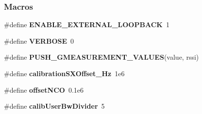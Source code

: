 \subsubsection*{Macros}
\begin{DoxyCompactItemize}
\item 
\#define {\bf E\+N\+A\+B\+L\+E\+\_\+\+E\+X\+T\+E\+R\+N\+A\+L\+\_\+\+L\+O\+O\+P\+B\+A\+CK}~1
\item 
\#define {\bf V\+E\+R\+B\+O\+SE}~0
\item 
\#define {\bf P\+U\+S\+H\+\_\+\+G\+M\+E\+A\+S\+U\+R\+E\+M\+E\+N\+T\+\_\+\+V\+A\+L\+U\+ES}(value,  rssi)
\item 
\#define {\bf calibration\+S\+X\+Offset\+\_\+\+Hz}~1e6
\item 
\#define {\bf offset\+N\+CO}~0.\+1e6
\item 
\#define {\bf calib\+User\+Bw\+Divider}~5
\end{DoxyCompactItemize}
